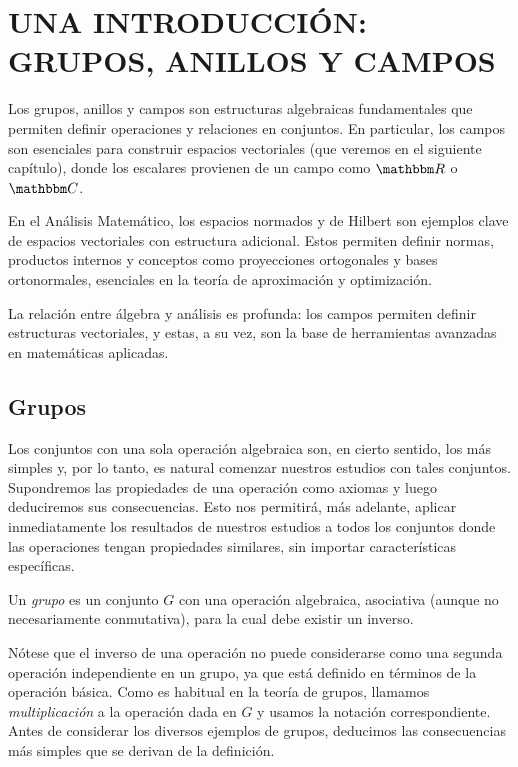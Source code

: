 \chapter{UNA INTRODUCCIÓN: GRUPOS, ANILLOS Y CAMPOS}
\printchaptertableofcontents

Los grupos, anillos y campos son estructuras algebraicas fundamentales que permiten definir operaciones y relaciones en conjuntos. En particular, los campos son esenciales para construir espacios vectoriales (que veremos en el siguiente capítulo), donde los escalares provienen de un campo como $\RR$ o $\CC$.

En el Análisis Matemático, los espacios normados y de Hilbert son ejemplos clave de espacios vectoriales con estructura adicional. Estos permiten definir normas, productos internos y conceptos como proyecciones ortogonales y bases ortonormales, esenciales en la teoría de aproximación y optimización.

La relación entre álgebra y análisis es profunda: los campos permiten definir estructuras vectoriales, y estas, a su vez, son la base de herramientas avanzadas en matemáticas aplicadas.

\section{Grupos}

Los conjuntos con una sola operación algebraica son, en cierto sentido, los más simples y, por lo tanto, es natural comenzar nuestros estudios con tales conjuntos. Supondremos las propiedades de una operación como axiomas y luego deduciremos sus consecuencias. Esto nos permitirá, más adelante, aplicar inmediatamente los resultados de nuestros estudios a todos los conjuntos donde las operaciones tengan propiedades similares, sin importar características específicas.

\begin{definicion}{}{}
    Un \emph{grupo} es un conjunto $G$ con una operación algebraica, asociativa (aunque no necesariamente conmutativa), para la cual debe existir un inverso.
\end{definicion}

Nótese que el inverso de una operación no puede considerarse como una segunda operación independiente en un grupo, ya que está definido en términos de la operación básica. Como es habitual en la teoría de grupos, llamamos \textit{multiplicación} a la operación dada en $G$ y usamos la notación correspondiente. Antes de considerar los diversos ejemplos de grupos, deducimos las consecuencias más simples que se derivan de la definición.

